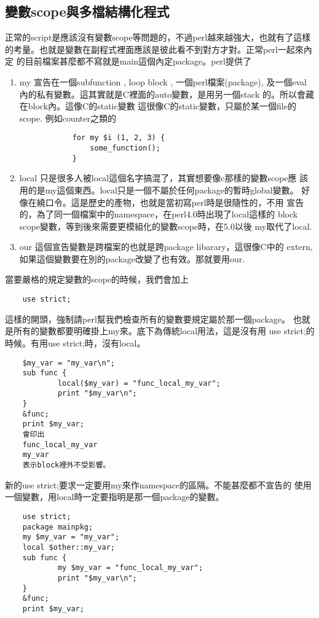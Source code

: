     \subsection{變數scope與多檔結構化程式}
    正常的script是應該沒有變數scope等問題的，不過perl越來越強大，也就有了這樣
    的考量。也就是變數在副程式裡面應該是彼此看不到對方才對。正常perl一起來內定
    的目前檔案甚麼都不寫就是main這個內定package。perl提供了
    \begin{enumerate}
    \item my 宣告在一個subfunction {}, loop block {}, 一個perl檔案(package), 
	    及一個eval內的私有變數。這其實就是C裡面的auto變數，是用另一個stack
	    的。所以會藏在block內。這像C的static變數 
	    這很像C的static變數，只屬於某一個file的scope.
	    例如counter之類的
	    \begin{verbatim}
            for my $i (1, 2, 3) {
                some_function();
            }
	    \end{verbatim}
    \item local 只是很多人被local這個名字搞混了，其實想要像c那樣的變數scope應
	    該用的是my這個東西。local只是一個不屬於任何package的暫時global變數。
	    好像在繞口令。這是歷史的產物，也就是當初寫perl時是很隨性的，不用
	    宣告的，為了同一個檔案中的namespace，在perl4.0時出現了local這樣的
	    block scope變數，等到後來需要更模組化的變數scope時，在5.0以後
	    my取代了local.
    \item our 這個宣告變數是跨檔案的也就是跨package libarary，這很像C中的
	    extern,如果這個變數要在別的package改變了也有效。那就要用our.
    \end{enumerate}
    當要嚴格的規定變數的scope的時候，我們會加上
    \begin{verbatim}
    use strict;
    \end{verbatim}
    這樣的開頭，強制請perl幫我們檢查所有的變數要規定屬於那一個package。
    也就是所有的變數都要明確掛上my來。底下為傳統local用法，這是沒有用
    use strict;的時候。有用use strict;時，沒有local。
    \begin{verbatim}
    $my_var = "my_var\n";
    sub func {
            local($my_var) = "func_local_my_var";
            print "$my_var\n";
    }
    &func;
    print $my_var;
    會印出
    func_local_my_var
    my_var
    表示block裡外不受影響。
    \end{verbatim}
    新的use strict;要求一定要用my來作namespace的區隔。不能甚麼都不宣告的
    使用一個變數，用local時一定要指明是那一個package的變數。
    \begin{verbatim}
    use strict;
    package mainpkg;
    my $my_var = "my_var";
    local $other::my_var;
    sub func {
            my $my_var = "func_local_my_var";
            print "$my_var\n";
    }
    &func;
    print $my_var;
    \end{verbatim}
